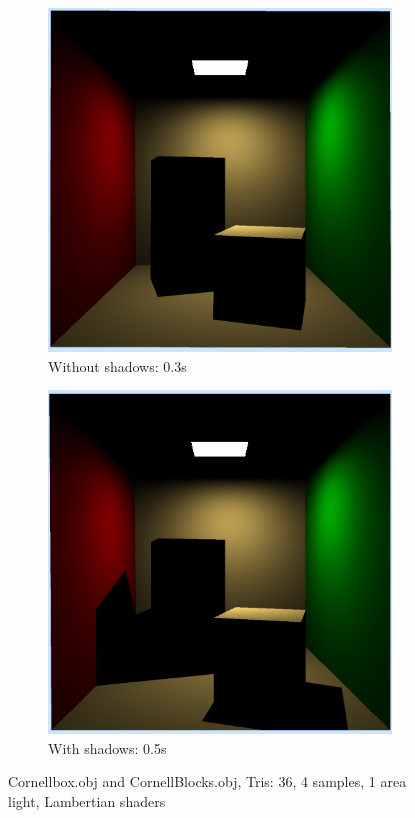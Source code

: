 \documentclass[a4paper]{article}
\begin{document}
\begin{figure}
	\centering
	\begin{subfigure}[b]{0.4\textwidth}
		\includegraphics[width=\textwidth]{week1/arealight_noshadows.png}
		\caption{Without shadows: 0.3s}
		\label{fig:arealightnoshadows}
	\end{subfigure}
	\begin{subfigure}[b]{0.4\textwidth}
		\includegraphics[width=\textwidth]{week1/arealight_shadows.png}
		\caption{With shadows: 0.5s}
		\label{fig:arealightshadows}
	\end{subfigure}
	\caption{Cornellbox.obj and CornellBlocks.obj, Tris: 36, 4 samples, 1 area light, Lambertian shaders}
\end{figure}
\end{document}
